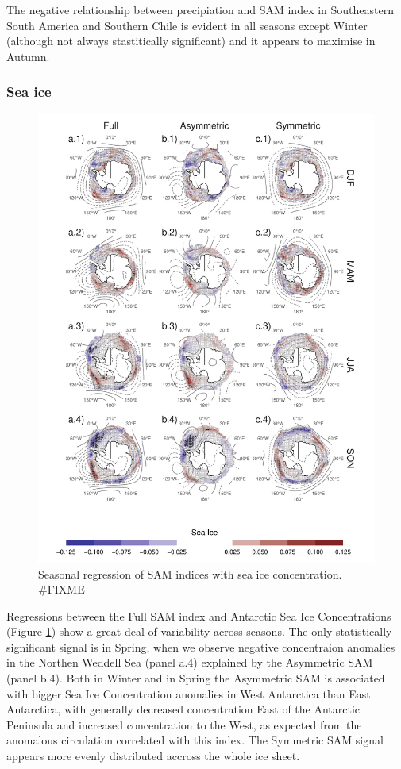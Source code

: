 \documentclass[]{ametsocV5}
\begin{document}
The negative relationship between precipiation and SAM index in
Southeastern South America and Southern Chile is evident in all seasons
except Winter (although not always stastitically significant) and it
appears to maximise in Autumn.

\subsubsection{Sea ice}

\begin{figure}
\includegraphics{regr-ice-1} \caption[Seasonal regression of SAM indices with sea ice concentration]{Seasonal regression of SAM indices with sea ice concentration. \#FIXME}\label{fig:regr-ice}
\end{figure}

Regressions between the Full SAM index and Antarctic Sea Ice
Concentrations (Figure \ref{fig:regr-ice}) show a great deal of
variability across seasons. The only statistically significant signal is
in Spring, when we observe negative concentraion anomalies in the
Northen Weddell Sea (panel a.4) explained by the Asymmetric SAM (panel
b.4). Both in Winter and in Spring the Asymmetric SAM is associated with
bigger Sea Ice Concentration anomalies in West Antarctica than East
Antarctica, with generally decreased concentration East of the Antarctic
Peninsula and increased concentration to the West, as expected from the
anomalous circulation correlated with this index. The Symmetric SAM
signal appears more evenly distributed accross the whole ice sheet.
\end{document}
